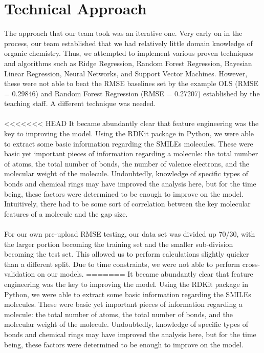 \documentclass{article}
\begin{document}
\section{Technical Approach}
The approach that our team took was an iterative one. Very early on in the process, our team established that we had relatively little domain knowledge of organic chemistry. Thus, we attempted to implement various proven techniques and algorithms such as Ridge Regression, Random Forest Regression, Bayesian Linear Regression, Neural Networks, and Support Vector Machines. However, these were not able to beat the RMSE baselines set by the example OLS (RMSE = 0.29846) and Random Forest Regression (RMSE = 0.27207) established by the teaching staff. A different technique was needed.\\\\
<<<<<<< HEAD
It became abundantly clear that feature engineering was the key to improving the model. Using the RDKit package in Python, we were able to extract some basic information regarding the SMILEs molecules. These were basic yet important pieces of information regarding a molecule: the total number of atoms, the total number of bonds, the number of valence electrons, and the molecular weight of the molecule. Undoubtedly, knowledge of specific types of bonds and chemical rings may have improved the analysis here, but for the time being, these factors were determined to be enough to improve on the model. Intuitively, there had to be some sort of correlation between the key molecular features of a molecule and the gap size.\\\\
For our own pre-upload RMSE testing, our data set was divided up 70/30, with the larger portion becoming the training set and the smaller sub-division becoming the test set. This allowed us to perform calculations slightly quicker than a different split. Due to time constraints, we were not able to perform cross-validation on our models. 
=======
It became abundantly clear that feature engineering was the key to improving the model. Using the RDKit package in Python, we were able to extract some basic information regarding the SMILEs molecules. These were basic yet important pieces of information regarding a molecule: the total number of atoms, the total number of bonds, and the molecular weight of the molecule. Undoubtedly, knowledge of specific types of bonds and chemical rings may have improved the analysis here, but for the time being, these factors were determined to be enough to improve on the model.\\\\
\end{document}
